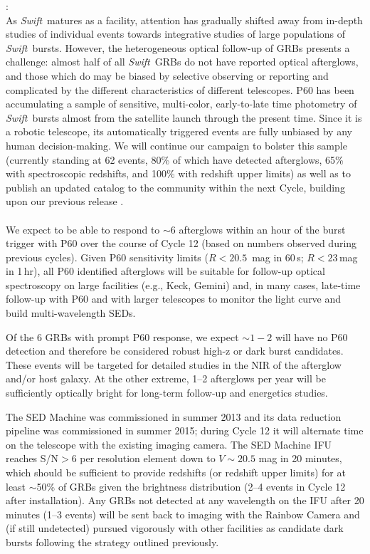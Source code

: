 \documentclass[letterpaper,11pt]{article}
\newcommand{\swift}{\textit{Swift}}
\begin{document}
\noindent {\it D) Population Statistics for \swift\ GRBs}:
\smallskip\\
As \swift\ matures as a facility, attention has gradually shifted away from in-depth 
studies of individual events towards integrative studies of large populations of 
\swift\ bursts.  However, the heterogeneous optical follow-up of GRBs presents a challenge: 
almost half of all \swift\ GRBs do not have reported optical afterglows, and those which do 
may be biased by selective observing or reporting and complicated by the different characteristics of different telescopes.  
P60 has been accumulating a sample of sensitive, multi-color, early-to-late time 
photometry of \swift\ bursts almost from the satellite launch through the present time.
Since it is a robotic telescope, its automatically triggered events are fully unbiased by
any human decision-making.  We will continue our campaign to bolster this sample
(currently standing at 62 events, 80\% of which have detected afterglows, 65\% with
spectroscopic redshifts, and 100\% with redshift upper limits) as well as to publish an 
updated catalog to the community within the next Cycle, building upon our previous 
release \citep{ckh+09,pcb+09}. \\

\smallskip\\
We expect to be able to respond to $\sim 6$ afterglows within an hour of the burst
trigger with P60 over the course of Cycle 12 (based on numbers observed during 
previous cycles).  Given P60 sensitivity limits ($R < 20.5$\, mag in 60\,s; 
$R < 23$\,mag in 1\,hr), all P60 identified afterglows will be suitable for 
follow-up optical spectroscopy on large facilities (e.g., Keck, Gemini) and, in 
many cases, late-time follow-up with P60 and with larger telescopes to monitor 
the light curve and build multi-wavelength SEDs.  

Of the 6 GRBs with prompt P60 response, we expect $\sim 1-2$ will have
no P60 detection and therefore be considered robust high-z or dark 
burst candidates.  These events will be targeted for detailed studies
in the NIR of the afterglow and/or host galaxy.  At the other extreme, 1--2 
afterglows per year will be sufficiently optically bright for long-term 
follow-up and energetics studies.

The SED Machine was commissioned in summer 2013 and its data reduction pipeline was commissioned in summer 2015; 
during Cycle 12 it will alternate time on the telescope with the existing 
imaging camera.  The SED Machine IFU
reaches S/N$>$6 per resolution element down to $V \sim 20.5$ mag in 20 minutes,
which should be sufficient to provide redshifts (or redshift upper limits) 
for at least $\sim$50\% of GRBs given the brightness distribution 
(2--4 events in Cycle 12 after installation).  Any GRBs not detected at any 
wavelength on the IFU after 20 minutes (1--3 events) will be sent back to 
imaging with the Rainbow Camera and (if still undetected) pursued vigorously 
with other facilities as candidate dark bursts following the strategy outlined 
previously.
\end{document}
